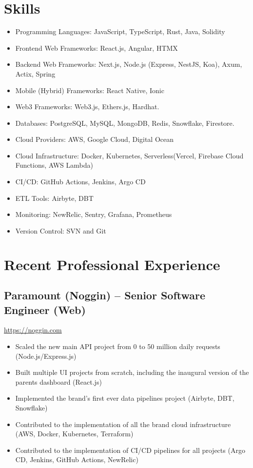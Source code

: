 \documentclass[11pt, a4paper]{article}
\begin{document}
\section*{Skills}
\begin{itemize}[noitemsep]
    \item Programming Languages: JavaScript, TypeScript, Rust, Java, Solidity
    \item Frontend Web Frameworks: React.js, Angular, HTMX
    \item Backend Web Frameworks: Next.js, Node.js (Express, NestJS, Koa), Axum, Actix, Spring
    \item Mobile (Hybrid) Frameworks: React Native, Ionic
    \item Web3 Frameworks: Web3.js, Ethers.js, Hardhat.
    \item Databases: PostgreSQL, MySQL, MongoDB, Redis, Snowflake, Firestore.
    \item Cloud Providers: AWS, Google Cloud, Digital Ocean
    \item Cloud Infrastructure: Docker, Kubernetes, Serverless(Vercel, Firebase Cloud Functions, AWS Lambda)
    \item CI/CD: GitHub Actions, Jenkins, Argo CD
    \item ETL Tools: Airbyte, DBT
    \item Monitoring: NewRelic, Sentry, Grafana, Prometheus
    \item Version Control: SVN and Git
\end{itemize}

\section*{Recent Professional Experience}
\subsection*{Paramount (Noggin) -- Senior Software Engineer (Web)}
\href{https://www.noggin.com}{https://noggin.com}
\begin{itemize}[noitemsep]
    \item Scaled the new main API project from 0 to 50 million daily requests (Node.js/Express.js)
    \item Built multiple UI projects from scratch, including the inaugural version of the parents dashboard (React.js)
    \item Implemented the brand's first ever data pipelines project (Airbyte, DBT, Snowflake)
    \item Contributed to the implementation of all the brand cloud infrastructure (AWS, Docker, Kubernetes, Terraform)
    \item Contributed to the implementation of CI/CD pipelines for all projects (Argo CD, Jenkins, GitHub Actions, NewRelic)
\end{itemize}
\end{document}
